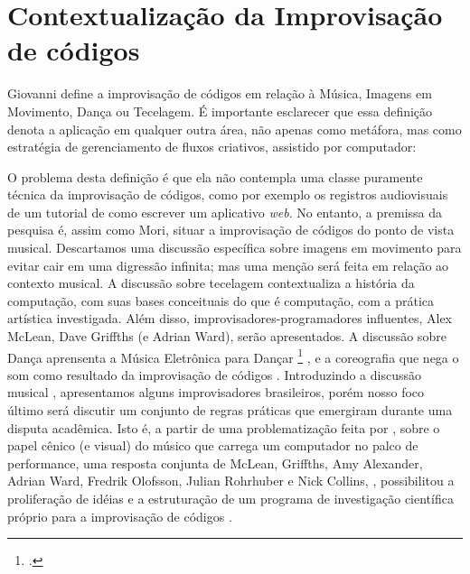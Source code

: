 \chapter{Contextualização da Improvisação de códigos}\label{cap:introducao}

Giovanni  define a improvisação de códigos em relação à Música, Imagens em Movimento, Dança ou Tecelagem. É importante esclarecer que essa definição denota a aplicação em qualquer outra área, não apenas como metáfora, mas como estratégia de gerenciamento de fluxos criativos, assistido por computador:

\begin{citacao}
\end{citacao}

O problema desta definição é que ela não contempla uma classe puramente técnica da improvisação de códigos, como por exemplo os registros audiovisuais de um tutorial de como escrever um aplicativo \emph{web}. No entanto, a premissa da pesquisa é, assim como Mori, situar a improvisação de códigos do ponto de vista musical. Descartamos uma discussão específica sobre imagens em movimento para evitar cair em uma digressão infinita; mas uma menção será feita em relação ao contexto musical. A discussão sobre tecelagem  contextualiza a história da computação, com suas bases conceituais do que é computação, com a prática artística investigada. Além disso, improvisadores-programadores influentes, Alex McLean, Dave Griffths (e Adrian Ward), serão apresentados. A discussão sobre Dança aprensenta a Música Eletrônica para Dançar \footnote{.} , e a coreografia que nega o som como resultado da improvisação de códigos . Introduzindo a discussão musical , apresentamos alguns improvisadores brasileiros, porém nosso foco último será discutir um conjunto de regras práticas que emergiram durante uma disputa acadêmica. Isto é, a partir de uma problematização feita por , sobre o papel cênico (e visual) do músico que carrega um computador no palco de performance, uma resposta conjunta de McLean, Griffths, Amy Alexander, Adrian Ward, Fredrik Olofsson, Julian Rohrhuber e Nick Collins, \cite{ward_live_2004}, possibilitou a proliferação de idéias e a estruturação de um programa de investigação científica próprio para a improvisação de códigos .

